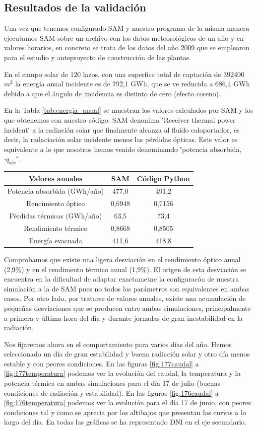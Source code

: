 \subsection{Resultados de la validación}
\label{resultados-validacion}
 
Una vez que tenemos configurado SAM y nuestro programa de la misma manera ejecutamos SAM sobre un archivo con los datos meteorológicos de un año y en valores horarios, en concreto se trata de los datos del año 2009 que se emplearon para el estudio y anteproyecto de construcción de las plantas.  

En el campo solar de 120 lazos, con una superfice total de captación de 392400 $m^2$ la energía anual incidente es de 792,1 GWh, que se ve reducida a 686,4 GWh debido a que el ángulo de incidencia es distinto de cero (efecto coseno).

En la Tabla \ref{tab:energia_anual} se muestran los valores  calculados por SAM y los que obtenemos con nuestro código. SAM denonima \''Receiver thermal power incident\'' a la radiación solar que finalmente alcanza al fluido caloportador, es decir, la radaciación solar incidente menos las pérdidas ópticas. Este valor es equivalente a lo que nosotros hemos venido denominando \''potencia absorbida, $\cdot q_{abs}$\''. 

\begin{longtable}[]{ccc}
Valores anuales  & SAM & Código Python\tabularnewline
\endhead
Potencia absorbida (GWh/año)	& 477,0		& 491,2			\tabularnewline
Rencimiento óptico 			& 0,6948 	& 0,7156		\tabularnewline
Pérdidas térmicas (GWh/año)	& 63,5		& 73,4			\tabularnewline
Rendimiento térmico			& 0,8668	& 0,8505		\tabularnewline
Energía evacuada				& 411,6		& 418,8        	\tabularnewline
\end{longtable}


Comprobamos que existe una ligera desviación en el rendimiento óptico anual (2,9\%) y en el rendimento térmico anual (1,9\%). El origen de esta desviación se encuentra en la dificultad de adaptar exactametne la configuracón de nuestra simulación a la de SAM pues no todos los parámetros son equivalentes en ambas casos. Por otro lado, por tratarse de valores anuales, existe una acumulación de pequeñas desviaciones que se producen entre ambas simulaciones, principalmente a primera y última hora del día  y durante jornadas de gran inestabilidad en la radiación. 

Nos fijaremos ahora en el comportamiento para varios días del año. Hemos seleccionado un día de gran estabilidad y buena radiación solar y otro día menos estable y con peores condiciones. En las figuras \ref{fig:177caudal}  a \ref{fig:177temperatura} podemos ver la evolución del caudal, la temperatura y la potencia térmica en ambas simulaciones para el día 17 de julio (buenas condiciones de radiación y estabilidad). En las figuras \ref{fig:176caudal}  a \ref{fig:176temperatura} podemos ver la evolución para el día 17 de junio, con peores condiciones tal y como se aprecia por los altibajos que presentan las curvas a lo largo del día. En todas las gráficas se ha representado DNI en el eje secundario.

